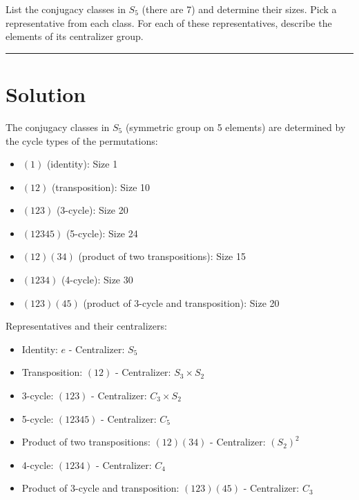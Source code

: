\documentclass[12pt]{amsart}
\theoremstyle{definition}
\numberwithin{equation}{section}
\begin{document}
\begin{exercise}{7} List the conjugacy classes in \(S_5\) (there are 7) and determine their sizes. Pick a representative from each class. For each of these representatives, describe the elements of its centralizer group.

    \noindent\rule{\linewidth}{1pt}

    \section*{Solution}
    
    The conjugacy classes in \(S_5\) (symmetric group on 5 elements) are determined by the cycle types of the permutations:
    
    \begin{itemize}
        \item \((1)\) (identity): Size 1
        \item \((12)\) (transposition): Size 10
        \item \((123)\) (3-cycle): Size 20
        \item \((12345)\) (5-cycle): Size 24
        \item \((12)(34)\) (product of two transpositions): Size 15
        \item \((1234)\) (4-cycle): Size 30
        \item \((123)(45)\) (product of 3-cycle and transposition): Size 20
    \end{itemize}
    
    Representatives and their centralizers:
    \begin{itemize}
        \item Identity: \(e\) - Centralizer: \(S_5\)
        \item Transposition: \((12)\) - Centralizer: \(S_3 \times S_2\)
        \item 3-cycle: \((123)\) - Centralizer: \(C_3 \times S_2\)
        \item 5-cycle: \((12345)\) - Centralizer: \(C_5\)
        \item Product of two transpositions: \((12)(34)\) - Centralizer: \((S_2)^2\)
        \item 4-cycle: \((1234)\) - Centralizer: \(C_4\)
        \item Product of 3-cycle and transposition: \((123)(45)\) - Centralizer: \(C_3\)
    \end{itemize}
\end{exercise}
\newpage
\end{document}
